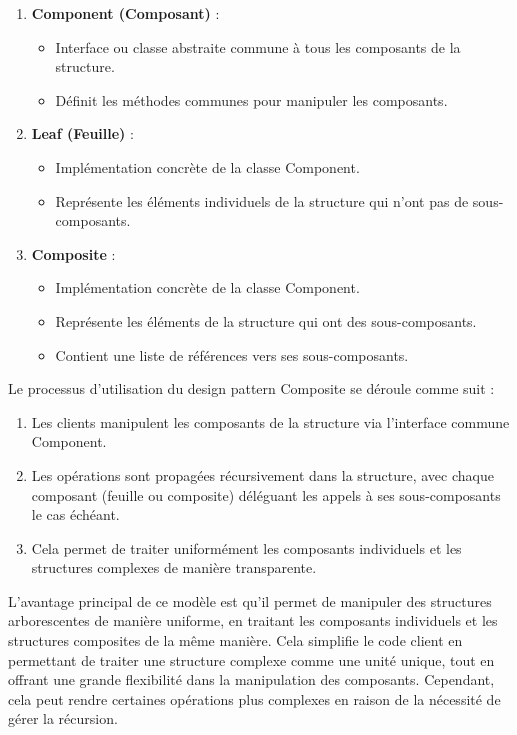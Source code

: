\begin{enumerate}[leftmargin=*,labelsep=3mm]
    \item \textbf{Component (Composant)} :
    \begin{itemize}
        \item Interface ou classe abstraite commune à tous les composants de la structure.
        \item Définit les méthodes communes pour manipuler les composants.
    \end{itemize}
    
    \item \textbf{Leaf (Feuille)} :
    \begin{itemize}
        \item Implémentation concrète de la classe Component.
        \item Représente les éléments individuels de la structure qui n'ont pas de sous-composants.
    \end{itemize}
    
    \item \textbf{Composite} :
    \begin{itemize}
        \item Implémentation concrète de la classe Component.
        \item Représente les éléments de la structure qui ont des sous-composants.
        \item Contient une liste de références vers ses sous-composants.
    \end{itemize}
\end{enumerate}

Le processus d'utilisation du design pattern Composite se déroule comme suit :

\begin{enumerate}[leftmargin=*,labelsep=3mm]
    \item Les clients manipulent les composants de la structure via l'interface commune Component.
    \item Les opérations sont propagées récursivement dans la structure, avec chaque composant (feuille ou composite) déléguant les appels à ses sous-composants le cas échéant.
    \item Cela permet de traiter uniformément les composants individuels et les structures complexes de manière transparente.
\end{enumerate}

L'avantage principal de ce modèle est qu'il permet de manipuler des structures arborescentes de manière uniforme, en traitant les composants individuels et les structures composites de la même manière. Cela simplifie le code client en permettant de traiter une structure complexe comme une unité unique, tout en offrant une grande flexibilité dans la manipulation des composants. Cependant, cela peut rendre certaines opérations plus complexes en raison de la nécessité de gérer la récursion.


